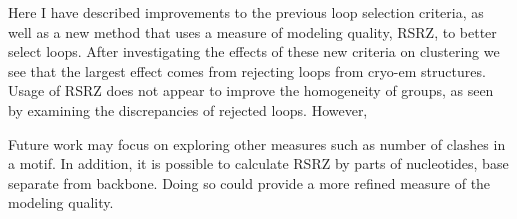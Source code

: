 Here I have described improvements to the previous loop selection criteria, as
well as a new method that uses a measure of modeling quality, RSRZ, to better
select loops. After investigating the effects of these new criteria on
clustering we see that the largest effect comes from rejecting loops from
cryo-em structures. Usage of RSRZ does not appear to improve the homogeneity of
groups, as seen by examining the discrepancies of rejected loops. However,

Future work may focus on exploring other measures such as number of clashes in a
motif. In addition, it is possible to calculate RSRZ by parts of nucleotides,
base separate from backbone. Doing so could provide a more refined measure of
the modeling quality.

